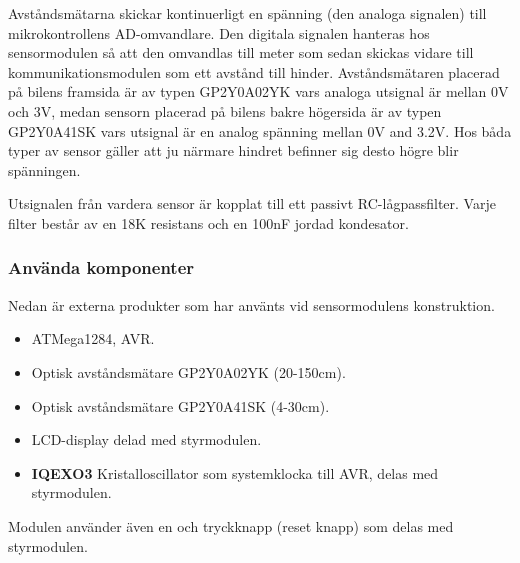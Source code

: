 \documentclass[tekniskrapport/tech.tex]{subfiles}
\begin{document}
Avståndsmätarna skickar kontinuerligt en spänning (den analoga signalen) till
mikrokontrollens AD-omvandlare. Den digitala signalen hanteras hos
sensormodulen så att den omvandlas till meter som sedan skickas vidare till
kommunikationsmodulen som ett avstånd till hinder. Avståndsmätaren placerad på
bilens framsida är av typen GP2Y0A02YK vars analoga utsignal är mellan 0V och
3V, medan sensorn placerad på bilens bakre högersida är av typen GP2Y0A41SK
vars utsignal är en analog spänning mellan 0V and 3.2V. Hos båda typer av
sensor gäller att ju närmare hindret befinner sig desto högre blir spänningen. 

Utsignalen från vardera sensor är kopplat till ett passivt RC-lågpassfilter.
Varje filter består av en 18K resistans och en 100nF jordad kondesator.

\subsubsection{Använda komponenter}
Nedan är externa produkter som har använts vid sensormodulens konstruktion.
\begin{itemize}
	\item \textbf{\modMicrocontroller} ATMega1284, AVR. 
    \item \textbf{\modDistf} Optisk avståndsmätare GP2Y0A02YK (20-150cm).
    \item \textbf{\modDists} Optisk avståndsmätare GP2Y0A41SK (4-30cm).
    \item \textbf{\modLcd} LCD-display delad med styrmodulen.
    \item \textbf{IQEXO3} Kristalloscillator som systemklocka till AVR, delas
    med styrmodulen.
\end{itemize}
Modulen använder även en {\modJtag} och tryckknapp (reset knapp) som delas med
styrmodulen.
\end{document}
